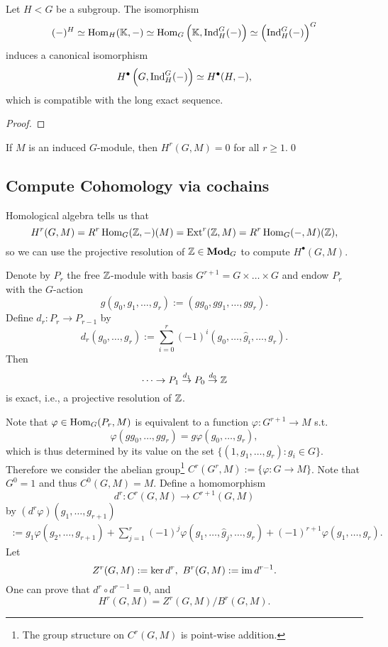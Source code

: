 \begin{proposition}\label{Shapiro's lemma}
Let $H < G$ be a subgroup.
The isomorphism\[(-)^H \simeq \operatorname{Hom}_H(\mathbb{K}, -) \simeq \operatorname{Hom}_G\left(\mathbb{K}, \operatorname{Ind}^G_H(-)\right)\simeq \left( \operatorname{Ind}_H^G(-) \right)^G\]induces a canonical isomorphism \[H^\bullet \left(G, \operatorname{Ind}^G_H (-)\right)\simeq H^\bullet (H, -),\]
which is compatible with the long exact sequence.
\end{proposition}
\begin{proof}
    
\end{proof}

\begin{corollary}\label{induced modules have trivial cohomology}
    If $M$ is an induced $G$-module, then $H^r(G, M) = 0$ for all $r\ge 1$.\qed
\end{corollary}


\subsection{Compute Cohomology via cochains}

Homological algebra tells us that \[H^r(G, M) = R^r\operatorname{Hom}_G(\mathbb{Z}, -)(M) = \operatorname{Ext}^r(\mathbb{Z}, M) = R^r\operatorname{Hom}_G(-, M)(\mathbb{Z}),\]
so we can use the projective resolution of $\mathbb{Z}\in\mathbf{Mod}_G$ to compute $H^\bullet(G, M)$.

Denote by $P_r$ the free $\mathbb{Z}$-module with basis $G^{r+1} = G\times\dots\times G$ and endow $P_r$ with the $G$-action
\[g(g_0, g_1,\dots, g_r) := (gg_0, gg_1, \dots, gg_r).\]
Define $d_r : P_r\to P_{r-1}$ by \[d_r(g_0, \dots, g_r) := \sum_{i=0}^r(-1)^i(g_0,\dots, \hat{g}_i, \dots, g_r).\]
Then \[\dots\to P_1\stackrel{d_1}{\to} P_0\stackrel{d_0}{\to} \mathbb{Z}\] is exact, i.e., a projective resolution of $\mathbb{Z}$.

Note that $\varphi\in\operatorname{Hom}_G(P_r, M)$ is equivalent to a function $\varphi : G^{r+1}\to M$ s.t. \[\varphi(gg_0, \dots, gg_r) = g\varphi(g_0, \dots, g_r),\]
which is thus determined by its value on the set $\{(1, g_1, \dots, g_r) : g_i\in G\}$. Therefore we consider the abelian group\footnote{The group structure on $C^r(G, M)$ is point-wise addition.} $C^r(G^r, M) := \{\varphi : G \to M\}$. Note that $G^0 = 1$ and thus $C^0(G, M) = M$.
Define a homomorphism \[d^r : C^r(G, M) \to C^{r+1}(G, M)\] by $(d^r\varphi)(g_1, \dots, g_{r+1})$\begin{align}
    := g_1\varphi(g_2, \dots, g_{r+1}) + \sum_{j=1}^r(-1)^j\varphi(g_1, \dots, \hat{g}_j, \dots, g_r) + (-1)^{r+1}\varphi(g_1, \dots, g_r).
\end{align}
Let \[Z^r(G, M) := \ker d^r,\ B^r(G, M) := \operatorname{im} d^{r-1}.\]
One can prove that $d^r\circ d^{r-1} = 0$, and \[H^r(G, M) = Z^r(G, M)/B^r(G, M).\]

